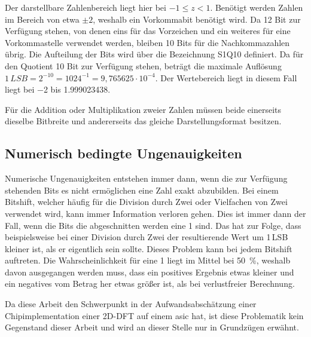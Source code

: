 Der darstellbare Zahlenbereich liegt hier bei $-1\leq z < 1$. Benötigt werden Zahlen im Bereich von etwa $\pm2$, weshalb ein Vorkommabit benötigt wird. 
Da 12 Bit zur Verfügung stehen, von denen eins für das Vorzeichen und ein weiteres für eine Vorkommastelle verwendet werden, bleiben 10 Bits für die Nachkommazahlen übrig.
Die Aufteilung der Bits wird über die Bezeichnung S1Q10 definiert.
Da für den Quotient 10 Bit zur Verfügung stehen, beträgt die maximale Auflösung $1\,LSB = 2^{-10} = {1024}^{-1} = 9,765625\cdot10^{-4}$.
Der Wertebereich liegt in diesem Fall liegt bei \num{-2} bis \num{1,999023438}. 

Für die Addition oder Multiplikation zweier Zahlen müssen beide einerseits dieselbe Bitbreite und andererseits das gleiche Darstellungsformat besitzen.



 
\subsection{Numerisch bedingte Ungenauigkeiten}\label{sec:NumerischeUngenauigkeiten}
Numerische Ungenauigkeiten entstehen immer dann, wenn die zur Verfügung stehenden Bits es nicht ermöglichen eine Zahl exakt abzubilden. 
Bei einem Bitshift, welcher häufig für die Division durch Zwei oder Vielfachen von Zwei verwendet wird, kann immer Information verloren gehen. Dies ist immer dann der Fall,
wenn die Bits die abgeschnitten werden eine 1 sind. Das hat zur Folge, dass beispielsweise
bei einer Division durch Zwei der resultierende Wert um 1\,LSB kleiner ist, als er eigentlich sein sollte. 
Dieses Problem kann bei jedem Bitshift auftreten. Die Wahrscheinlichkeit für eine 1 liegt im Mittel bei \SI{50}{\percent}, weshalb davon ausgegangen werden muss, dass ein 
positives Ergebnis etwas kleiner und ein negatives vom Betrag her etwas größer ist, als bei verlustfreier Berechnung. 


Da diese Arbeit den Schwerpunkt in der Aufwandsabschätzung einer Chipimplementation einer 2D-DFT auf einem \gls{asic} hat, ist diese Problematik kein Gegenstand dieser Arbeit und
wird an dieser Stelle nur in Grundzügen erwähnt. %

